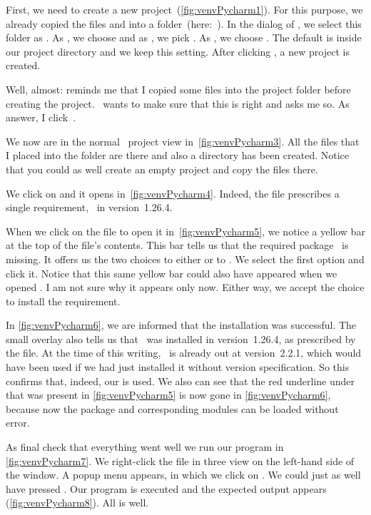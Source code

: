 First, we need to create a new project~(\cref{fig:venvPycharm1}).
For this purpose, we already copied the files  and  into a folder~(here:~).
In the  dialog of \pycharm, we select this folder as .
As , we choose  and as , we pick .
As , we choose .
The default  is  inside our project directory and we keep this setting.
After clicking , a new project is created.

Well, almost:
 reminds me that I copied some files into the project folder before creating the project.
\pycharm\ wants to make sure that this is right and asks me so.
As answer, I click~.

We now are in the normal \pycharm\ project view in~\cref{fig:venvPycharm3}.
All the files that I placed into the folder are there and also a  directory has been created.
Notice that you could as well create an empty project and copy the files there.

We click on  and it opens in~\cref{fig:venvPycharm4}.
Indeed, the file prescribes a single requirement, \numpy\ in version~1.26.4.

When we click on the file  to open it in~\cref{fig:venvPycharm5}, we notice a yellow bar at the top of the file's contents.
This bar tells us that the required package \numpy\ is missing.
It offers us the two choices to either  or to .
We select the first option and click it.
Notice that this same yellow bar could also have appeared when we opened .
I am not sure why it appears only now.
Either way, we accept the choice to install the requirement.

In \cref{fig:venvPycharm6}, we are informed that the installation was successful.
The small overlay also tells us that \numpy\ was installed in version~1.26.4, as prescribed by the  file.
At the time of this writing, \numpy\ is already out at version~2.2.1, which would have been used if we had just installed it without version specification.
So this confirms that, indeed, our  is used.
We also can see that the red underline under  that was present in \cref{fig:venvPycharm5} is now gone in \cref{fig:venvPycharm6}, because now the package and corresponding modules can be loaded without error.

As final check that everything went well we run our program  in \cref{fig:venvPycharm7}.
We right-click the file in three view on the left-hand side of the window.
A popup menu appears, in which we click on .
We could just as well have pressed .
Our program is executed and the expected output appears (\cref{fig:venvPycharm8}).
All is well.%
%
\FloatBarrier%
\endhsection%
%
